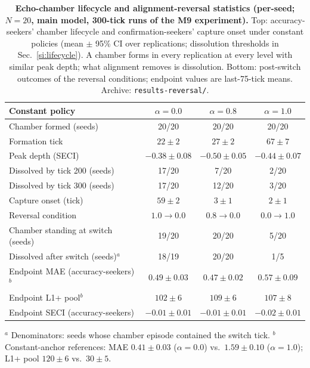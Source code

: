 \documentclass[11pt]{article}
\begin{document}
\begin{table}[h!]
\centering
\caption{\textbf{Echo-chamber lifecycle and alignment-reversal
statistics (per-seed; $N = 20$, main model, 300-tick runs of the M9
experiment).} Top: accuracy-seekers' chamber lifecycle and
confirmation-seekers' capture onset under constant policies (mean $\pm$
95\% CI over replications; dissolution thresholds in
Sec.~\ref{si:lifecycle}). A chamber forms in every replication at every
level with similar peak depth; what alignment removes is dissolution.
Bottom: post-switch outcomes of the reversal conditions; endpoint
values are last-75-tick means. Archive:
\texttt{results-reversal/}.}\label{tab:s11-lifecycle}
\footnotesize
\begin{tabular}{@{}lccc@{}}
\toprule
Constant policy & $\alpha = 0.0$ & $\alpha = 0.8$ & $\alpha = 1.0$ \\
\midrule
Chamber formed (seeds) & 20/20 & 20/20 & 20/20 \\
Formation tick & $22 \pm 2$ & $27 \pm 2$ & $67 \pm 7$ \\
Peak depth (SECI) & $-0.38 \pm 0.08$ & $-0.50 \pm 0.05$ & $-0.44 \pm 0.07$ \\
Dissolved by tick 200 (seeds) & 17/20 & 7/20 & 2/20 \\
Dissolved by tick 300 (seeds) & 17/20 & 12/20 & 3/20 \\
Capture onset (tick) & $59 \pm 2$ & $3 \pm 1$ & $2 \pm 1$ \\
\midrule
Reversal condition & $1.0 \to 0.0$ & $0.8 \to 0.0$ & $0.0 \to 1.0$ \\
\midrule
Chamber standing at switch (seeds) & 19/20 & 20/20 & 5/20 \\
Dissolved after switch (seeds)$^{a}$ & 18/19 & 20/20 & 1/5 \\
Endpoint MAE (accuracy-seekers)$^{b}$ & $0.49 \pm 0.03$ & $0.47 \pm 0.02$ & $0.57 \pm 0.09$ \\
Endpoint L1+ pool$^{b}$ & $102 \pm 6$ & $109 \pm 6$ & $107 \pm 8$ \\
Endpoint SECI (accuracy-seekers) & $-0.01 \pm 0.01$ & $-0.01 \pm 0.01$ & $-0.02 \pm 0.01$ \\
\bottomrule
\end{tabular}

\smallskip
\raggedright\footnotesize
$^{a}$ Denominators: seeds whose chamber episode contained the switch
tick. $^{b}$ Constant-anchor references: MAE $0.41 \pm 0.03$
($\alpha = 0.0$) vs.\ $1.59 \pm 0.10$ ($\alpha = 1.0$); L1+ pool $120
\pm 6$ vs.\ $30 \pm 5$.
\end{table}

\clearpage


\end{document}
